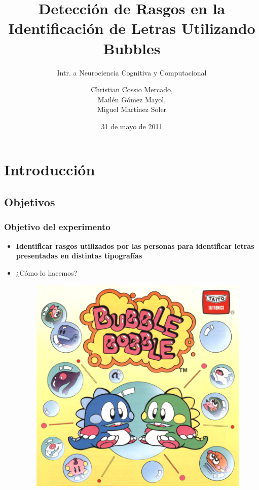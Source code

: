\documentclass[10pt]{beamer}
\title[Identificaci\'on de Letras Utilizando Bubbles]{Detecci\'on de Rasgos en la Identificaci\'on de Letras Utilizando Bubbles}
\subtitle{Intr. a Neurociencia Cognitiva y Computacional}
\author[Miguel, Mail\'en, Christian]{Christian Cossio Mercado,\\Mail\'en G\'omez Mayol,\\Miguel Mart\'inez Soler}
\institute[FCEyN,UBA]{Departamento de Computaci\'on - FCEyN, UBA}
\date{31 de mayo de 2011}
\begin{document}
\begin{frame}%
\titlepage
\end{frame}

\section{Introducci\'on}
  \subsection{Objetivos}
      \begin{frame}
	\frametitle{Objetivo del experimento}
	\begin{itemize}
		\item \textbf{Identificar rasgos utilizados por las personas para identificar letras presentadas en distintas tipograf\'ias}\pause
		\item \alert{¿Cómo lo hacemos?}\pause
		  \begin{figure}
			  \includegraphics[height=0.7\textheight]{graficos/bubblebobble.png}
		  \end{figure}
	\end{itemize}
      \end{frame}
\end{document}
